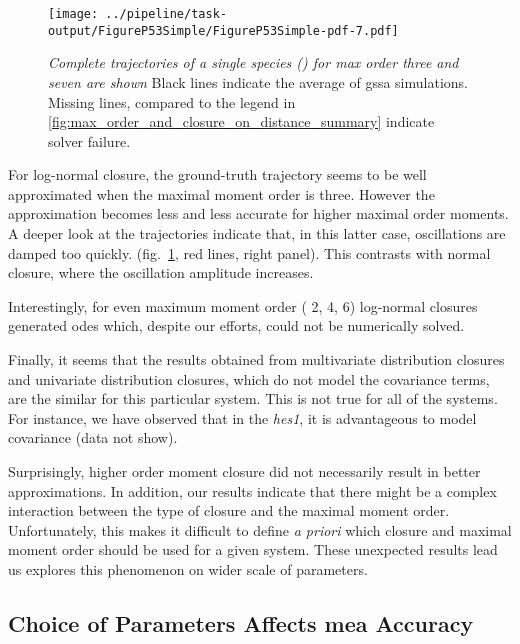 \begin{figure}
    \centering
    \texttt{[image: ../pipeline/task-output/FigureP53Simple/FigureP53Simple-pdf-7.pdf]}
    \caption{\emph{Complete trajectories of a single species (\pft) for max order three and seven are shown} 
    Black lines indicate the average of \gls{gssa} simulations. 
    Missing lines, compared to the legend in \autoref{fig:max_order_and_closure_on_distance_summary} indicate solver failure.}
    \label{fig:max_order_and_closure_on_distance_trajectories}
\end{figure}

 
For log-normal closure, the ground-truth trajectory seems to be well approximated when the maximal moment order is three.
However the approximation becomes less and less accurate for higher maximal order moments.
A deeper look at the trajectories indicate that, in this latter case,
oscillations are damped too quickly. (fig.~\ref{fig:max_order_and_closure_on_distance_trajectories}, red lines, right panel).
This contrasts with normal closure, where the oscillation amplitude increases.

Interestingly, for even maximum moment order (\ie{} 2, 4, 6) log-normal closures generated \gls{ode}s which, despite our efforts, could not be numerically solved.

Finally, it seems that the results obtained from multivariate distribution closures and univariate distribution closures,
 which do not model the covariance terms, are the similar for this particular system.
This is not true for all of the systems.
For instance, we have observed that in the \emph{hes1}, it is advantageous to model covariance (data not show).

Surprisingly, higher order moment closure did not necessarily result in better approximations.
In addition, our results indicate that there might be a complex interaction between the type of closure and the maximal moment order.
Unfortunately, this makes it difficult to define \emph{a priori} which closure and maximal moment order should be used for a given system.
These unexpected results lead us explores this phenomenon on wider scale of parameters.

\subsection{Choice of Parameters Affects \acrshort{mea} Accuracy}

